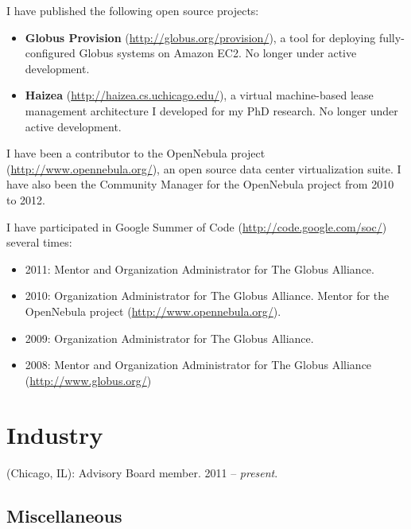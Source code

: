 \documentclass{resume}
\begin{document}
\begin{category}{}
\citembullet I have published the following open source projects:

\begin{itemize}
 \item \textbf{Globus Provision} (\url{http://globus.org/provision/}), a tool for deploying fully-configured Globus systems on Amazon EC2. No longer under active development.
 \item \textbf{Haizea} (\url{http://haizea.cs.uchicago.edu/}), a virtual machine-based lease management architecture I developed for my PhD research. No longer under active development.
\end{itemize}

\citembullet I have been a contributor to the OpenNebula project (\url{http://www.opennebula.org/}), an open source data center virtualization suite. I have also been the Community Manager for the OpenNebula project from 2010 to 2012.

\citembullet I have participated in Google Summer of Code (\url{http://code.google.com/soc/}) several times:

\begin{itemize}
 \item 2011: Mentor and Organization Administrator for The Globus Alliance.
 \item 2010: Organization Administrator for The Globus Alliance. Mentor for the OpenNebula project (\url{http://www.opennebula.org/}).
 \item 2009: Organization Administrator for The Globus Alliance.
 \item 2008: Mentor and Organization Administrator for The Globus Alliance (\url{http://www.globus.org/})
\end{itemize}
\end{category}


\section*{\hspace{-1cm}Industry}

\begin{category}{}
 (Chicago, IL): Advisory Board member. 2011 -- \emph{present}.
\end{category}

\pagebreak

\begin{center}
\section*{\huge Miscellaneous}
\vspace{2ex}
\end{center}
\end{document}
